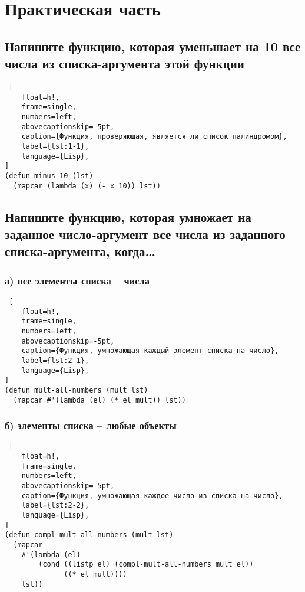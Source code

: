 \chapter{Практическая часть}

\section{Напишите функцию, которая уменьшает на 10 все числа из списка-аргумента этой функции}

\begin{lstlisting} [
	float=h!,
	frame=single,
	numbers=left,
	abovecaptionskip=-5pt,
	caption={Функция, проверяющая, является ли список палиндромом},
	label={lst:1-1},
	language={Lisp},
]
(defun minus-10 (lst) 
  (mapcar (lambda (x) (- x 10)) lst))
\end{lstlisting}

\section{Напишите функцию, которая умножает на заданное число-аргумент все числа из заданного списка-аргумента, когда\dots}

\subsection{а) все элементы списка -- числа}

\begin{lstlisting} [
	float=h!,
	frame=single,
	numbers=left,
	abovecaptionskip=-5pt,
	caption={Функция, умножающая каждый элемент списка на число},
	label={lst:2-1},
	language={Lisp},
]
(defun mult-all-numbers (mult lst)
  (mapcar #'(lambda (el) (* el mult)) lst))
\end{lstlisting}

\subsection{б) элементы списка -- любые объекты}

\begin{lstlisting} [
	float=h!,
	frame=single,
	numbers=left,
	abovecaptionskip=-5pt,
	caption={Функция, умножающая каждое число из списка на число},
	label={lst:2-2},
	language={Lisp},
]
(defun compl-mult-all-numbers (mult lst)
  (mapcar
    #'(lambda (el)
        (cond ((listp el) (compl-mult-all-numbers mult el))
              ((* el mult))))
    lst))
\end{lstlisting}

